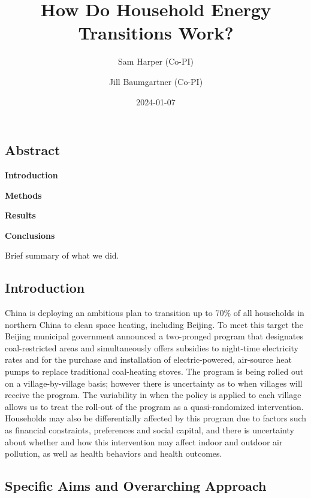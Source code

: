 \documentclass[
  letterpaper,
  DIV=11,
  numbers=noendperiod]{scrartcl}
\title{How Do Household Energy Transitions Work?}
\author{Sam Harper (Co-PI) \and Jill Baumgartner (Co-PI)}
\date{2024-01-07}
\renewcommand*\contentsname{Table of contents}
\newcommand\contentsname{Table of contents}
\begin{document}
\maketitle
\ifdefined\Shaded\renewenvironment{Shaded}{\begin{tcolorbox}[interior hidden, frame hidden, borderline west={3pt}{0pt}{shadecolor}, boxrule=0pt, enhanced, breakable, sharp corners]}{\end{tcolorbox}}\fi

\renewcommand*\contentsname{Table of contents}
{
\hypersetup{linkcolor=}
\setcounter{tocdepth}{3}
\tableofcontents
}
\hypertarget{abstract}{%
\subsection{Abstract}\label{abstract}}

\textbf{Introduction}

\textbf{Methods}

\textbf{Results}

\textbf{Conclusions}

Brief summary of what we did.

\hypertarget{introduction}{%
\subsection{Introduction}\label{introduction}}

China is deploying an ambitious plan to transition up to 70\% of all
households in northern China to clean space heating, including Beijing.
To meet this target the Beijing municipal government announced a
two-pronged program that designates coal-restricted areas and
simultaneously offers subsidies to night-time electricity rates and for
the purchase and installation of electric-powered, air-source heat pumps
to replace traditional coal-heating stoves. The program is being rolled
out on a village-by-village basis; however there is uncertainty as to
when villages will receive the program. The variability in when the
policy is applied to each village allows us to treat the roll-out of the
program as a quasi-randomized intervention. Households may also be
differentially affected by this program due to factors such as financial
constraints, preferences and social capital, and there is uncertainty
about whether and how this intervention may affect indoor and outdoor
air pollution, as well as health behaviors and health outcomes.

\hypertarget{specific-aims-and-overarching-approach}{%
\subsection{Specific Aims and Overarching
Approach}\label{specific-aims-and-overarching-approach}}
\end{document}
